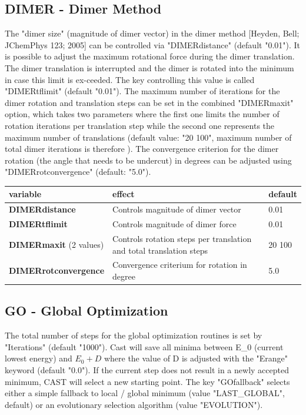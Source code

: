 \documentclass[10pt,a4paper]{article} %
\begin{document}
{	\subsection{DIMER - Dimer Method}
	The "dimer size" (magnitude of dimer vector) in the dimer method [Heyden, Bell; JChemPhys 123; 2005] can be controlled via "DIMERdistance" (default "0.01").
	It is possible to adjust the maximum rotational force during the dimer translation. The dimer translation is interrupted and the dimer is rotated into the minimum in case this limit is ex-ceeded. The key controlling this value is called "DIMERtflimit" (default "0.01").
	The maximum number of iterations for the dimer rotation and translation steps can be set in the combined "DIMERmaxit" option, which takes two parameters where the first one limits the number of rotation iterations per translation step while the second one represents the maximum number of translations (default value: "20 100", maximum number of total dimer iterations is therefore ).
	The convergence criterion for the dimer rotation (the angle that needs to be undercut) in degrees can be adjusted using "DIMERrotconvergence" (default: "5.0").

	\begin{tabularx}{\textwidth}{l|X|X}
		variable & effect & default \\
		\hline
		\textbf{DIMERdistance} & Controls magnitude of dimer vector & 0.01 \\
		\textbf{DIMERtflimit} & Controls magnitude of dimer force & 0.01 \\
		\textbf{DIMERmaxit} (2 values) & Controls rotation steps per translation and total translation steps & 20 100 \\
		\textbf{DIMERrotconvergence} & Convergence criterium for rotation in degree & 5.0 \\
	\end{tabularx}

	\subsection{GO - Global Optimization}
	The total number of steps for the global optimization routines is set by "Iterations" (default "1000"). Cast will save all minima between E_0 (current lowest energy) and $E_0 + D$ where the value of D is adjusted with the "Erange" keyword (default "0.0").
	If the current step does not result in a newly accepted minimum, CAST will select a new starting point. The key "GOfallback" selects either a simple fallback to local / global minimum (value "LAST_GLOBAL", default) or an evolutionary selection algorithm (value "EVOLUTION").

}
\end{document}
